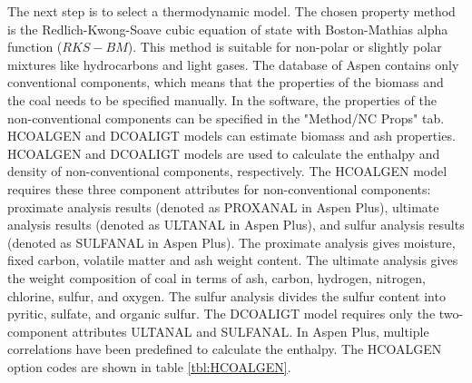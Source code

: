 The next step is to select a thermodynamic model. The chosen property method is the Redlich-Kwong-Soave cubic equation of state with Boston-Mathias alpha function ($RKS-BM$). This method is suitable for non-polar or slightly polar mixtures like hydrocarbons and light gases. The database of Aspen contains only conventional components, which means that the properties of the biomass and the coal needs to be specified manually. In the software, the properties of the non-conventional components can be specified in the "Method/NC Props" tab. HCOALGEN and DCOALIGT models can estimate biomass and ash properties. HCOALGEN and DCOALIGT models are used to calculate the enthalpy and density of non-conventional components, respectively. The HCOALGEN model requires these three component attributes for non-conventional components: proximate analysis results (denoted as PROXANAL in Aspen Plus), ultimate analysis results (denoted as ULTANAL in Aspen Plus), and sulfur analysis results (denoted as SULFANAL in Aspen Plus). The proximate analysis gives moisture, fixed carbon, volatile matter and ash weight content. The ultimate analysis gives the weight composition of coal in terms of ash, carbon, hydrogen, nitrogen, chlorine, sulfur, and oxygen. The sulfur analysis divides the sulfur content into pyritic, sulfate, and organic sulfur. The DCOALIGT model requires only the two-component attributes ULTANAL and SULFANAL. In Aspen Plus, multiple correlations have been predefined to calculate the enthalpy. The HCOALGEN option codes are shown in table \ref{tbl:HCOALGEN}. 

